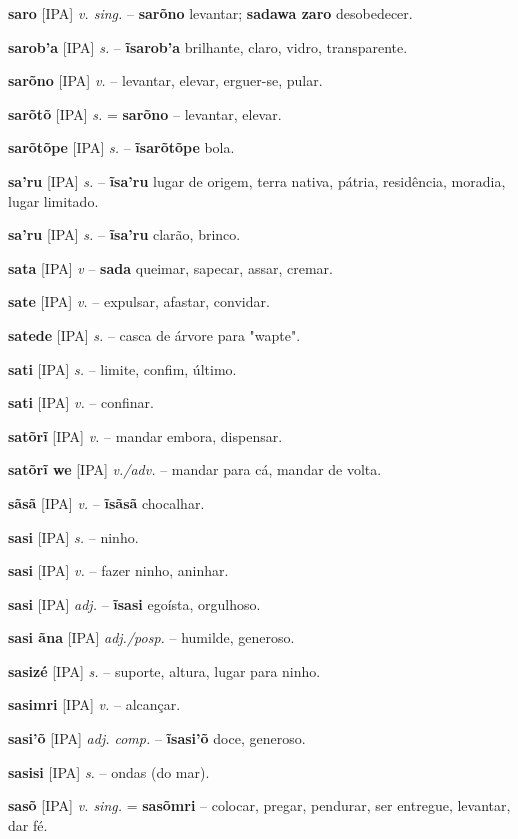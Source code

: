 \textbf{saro} [IPA] \textit{v. sing.} -- \textbf{sarõno} levantar; \textbf{sadawa zaro} desobedecer.

\textbf{sarob'a} [IPA] \textit{s.} -- \textbf{ĩsarob'a} brilhante, claro, vidro, transparente.

\textbf{sarõno} [IPA] \textit{v.} -- levantar, elevar, erguer-se, pular.

\textbf{sarõtõ} [IPA] \textit{s.} = \textbf{sarõno} -- levantar, elevar.

\textbf{sarõtõpe} [IPA] \textit{s.} -- \textbf{ĩsarõtõpe} bola.

\textbf{sa'ru} [IPA] \textit{s.} -- \textbf{ĩsa'ru} lugar de origem, terra nativa, pátria, residência, moradia, lugar limitado.

\textbf{sa'ru} [IPA] \textit{s.} -- \textbf{ĩsa'ru} clarão, brinco.

\textbf{sata} [IPA] \textit{v} -- \textbf{sada} queimar, sapecar, assar, cremar.

\textbf{sate} [IPA] \textit{v.} -- expulsar, afastar, convidar.

\textbf{satede} [IPA] \textit{s.} -- casca de árvore para "wapte".

\textbf{sati} [IPA] \textit{s.} -- limite, confim, último.

\textbf{sati} [IPA] \textit{v.} -- confinar.

\textbf{satõrĩ} [IPA] \textit{v.} -- mandar embora, dispensar.

\textbf{satõrĩ we} [IPA] \textit{v./adv.} -- mandar para cá, mandar de volta.

\textbf{sãsã} [IPA] \textit{v.} -- \textbf{ĩsãsã} chocalhar.

\textbf{sasi} [IPA] \textit{s.} -- ninho.

\textbf{sasi} [IPA] \textit{v.} -- fazer ninho, aninhar.

\textbf{sasi} [IPA] \textit{adj.} -- \textbf{ĩsasi} egoísta, orgulhoso.

\textbf{sasi ãna} [IPA] \textit{adj./posp.} -- humilde, generoso.

\textbf{sasizé} [IPA] \textit{s.} -- suporte, altura, lugar para ninho.

\textbf{sasimri} [IPA] \textit{v.} -- alcançar.

\textbf{sasi'õ} [IPA] \textit{adj. comp.} -- \textbf{ĩsasi'õ} doce, generoso.

\textbf{sasisi} [IPA] \textit{s.} -- ondas (do mar).

\textbf{sasõ} [IPA] \textit{v. sing.} = \textbf{sasõmri} -- colocar, pregar, pendurar, ser entregue, levantar, dar fé.

